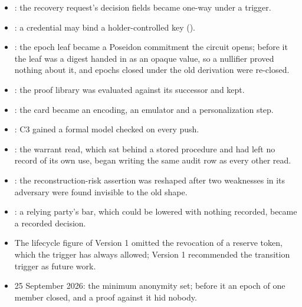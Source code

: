 \begin{itemize}
  \item {}: the recovery request's decision fields became one-way under a trigger.
  \item {}: a credential may bind a holder-controlled key ().
  \item {}: the epoch leaf became a Poseidon commitment the circuit opens; before it the leaf
    was a  digest handed in as an opaque value, so a nullifier proved nothing about
    it, and epochs closed under the old derivation were re-closed.
  \item {}: the proof library was evaluated against its successor and kept.
  \item {}: the card became an encoding, an emulator and a personalization step.
  \item {}: C3 gained a formal model checked on every push.
  \item {}: the warrant read, which sat behind a stored procedure and had left no record of
    its own use, began writing the same audit row as every other read.
  \item {}: the reconstruction-risk assertion was reshaped after two weaknesses in its
    adversary were found invisible to the old shape.
  \item {}: a relying party's bar, which could be lowered with nothing recorded, became a
    recorded decision.
  \item The lifecycle figure of Version 1 omitted the revocation of a reserve token, which the trigger
    has always allowed; Version 1 recommended the transition trigger as future work.
  \item 25 September 2026: the minimum anonymity set; before it an epoch of one member closed, and a
    proof against it hid nobody.
\end{itemize}


